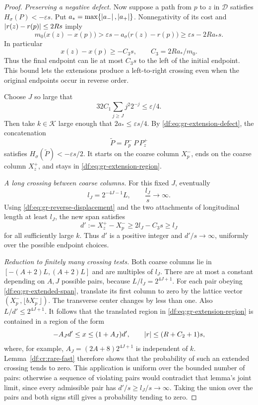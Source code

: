 \begin{proof}
\emph{Preserving a negative defect.}
Now suppose a path from $p$ to $z$ in $\mathcal D$ satisfies
$H_\sigma(P)<-\varepsilon s$. Put
$a_* =\max\{\left\lvert a_-\right\rvert,\left\lvert a_+\right\rvert\}$. Nonnegativity of its cost and
$\left\lvert r(z)-r(p)\right\rvert\leq2Rs$ imply
\[
 m_0\bigl(x(z)-x(p)\bigr)
 >\varepsilon s-a_\sigma\bigl(r(z)-r(p)\bigr)
 \geq\varepsilon s-2Ra_*s.
\]
In particular
\begin{equation}\label{df:eq:gr-reverse-displacement}
 x(z)-x(p)\geq-C_3s,\qquad C_3=2Ra_*/m_0.
\end{equation}
Thus the final endpoint can lie at most $C_3s$ to the left of the
initial endpoint. This bound lets the extensions produce a left-to-right
crossing even when the original endpoints occur in reverse order.

Choose $J$ so large that
\[
 32C_1\sum_{j\geq J}j^2 2^{-j}\leq\varepsilon/4.
\]
Then take $k\in\mathcal K$ large enough that $2a_*\leq\varepsilon s/4$.
By \eqref{df:eq:gr-extension-defect}, the concatenation
\[
 \widetilde P=P_p^-\,P\,P_z^+
\]
satisfies $H_\sigma(\widetilde P)<-\varepsilon s/2$. It starts on the coarse
column $X_p^-$, ends on the coarse column $X_z^+$, and stays in
\eqref{df:eq:gr-extension-region}.

\emph{A long crossing between coarse columns.}
For this fixed $J$, eventually
\[
 l_J=2^{-4J-1}L,\qquad \frac{l_J}{s}\longrightarrow\infty.
\]
Using \eqref{df:eq:gr-reverse-displacement} and the two attachments of
longitudinal length at least $l_J$, the new span satisfies
\begin{equation}\label{df:eq:gr-extended-span}
 d':=X_z^+-X_p^-
 \geq2l_J-C_3s\geq l_J
\end{equation}
for all sufficiently large $k$. Thus $d'$ is a positive integer and
$d'/s\to\infty$, uniformly over the possible endpoint choices.

\emph{Reduction to finitely many crossing tests.}
Both coarse columns lie in $[-(A+2)L,(A+2)L]$ and are multiples of
$l_J$. There are at most a constant depending on $A,J$ possible pairs,
because $L/l_J=2^{4J+1}$. For each pair obeying
\eqref{df:eq:gr-extended-span}, translate its first column to zero by the
lattice vector $(X_p^-,\lfloor bX_p^-\rfloor)$. The transverse center
changes by less than one. Also $L/d'\leq2^{4J+1}$. It follows that the
translated region in \eqref{df:eq:gr-extension-region} is contained in a
region of the form
\[
 -A_Jd'\leq x\leq(1+A_J)d',\qquad
 \left\lvert r\right\rvert\leq(R+C_2+1)s,
\]
where, for example, $A_J=(2A+8)2^{4J+1}$ is independent of $k$.
Lemma~\ref{df:cr:rare-fast} therefore shows that the probability of such
an extended crossing tends to zero. This application is uniform over
the bounded number of pairs: otherwise a sequence of violating pairs
would contradict that lemma's joint limit, since every admissible pair
has $d'/s\geq l_J/s\to\infty$. Taking the union over the pairs and both
signs still gives a probability tending to zero.


\end{proof}
